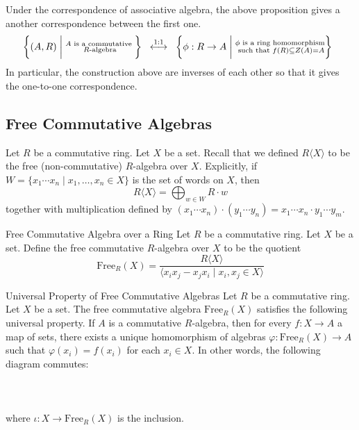 \documentclass[a4paper]{article}
\begin{document}
Under the correspondence of associative algebra, the above proposition gives a another correspondence between the first one. $$\left\{(A,R)\;\bigg{|}\;\substack{A\text{ is a commutative }\\R\text{-algebra}}\right\}\;\;\overset{1:1}{\longleftrightarrow}\;\;\left\{\phi:R\to A\;\bigg{|}\;\substack{\phi\text{ is a ring homomorphism}\\\text{ such that }f(R)\subseteq Z(A)=A}\right\}\;\;$$ In particular, the construction above are inverses of each other so that it gives the one-to-one correspondence. 

\subsection{Free Commutative Algebras}
Let $R$ be a commutative ring. Let $X$ be a set. Recall that we defined $R\langle X\rangle$ to be the free (non-commutative) $R$-algebra over $X$. Explicitly, if $W=\{x_1\cdots x_n\;|\;x_1,\dots,x_n\in X\}$ is the set of words on $X$, then $$R\langle X\rangle=\bigoplus_{w\in W}R\cdot w$$ together with multiplication defined by $(x_1\cdots x_n)\cdot(y_1\cdots y_n)=x_1\cdots x_n\cdot y_1\cdots y_m$. 

\begin{defn}{Free Commutative Algebra over a Ring}{} Let $R$ be a commutative ring. Let $X$ be a set. Define the free commutative $R$-algebra over $X$ to be the quotient $$\text{Free}_R(X)=\frac{R\langle X\rangle}{\langle x_ix_j-x_jx_i\;|\;x_i,x_j\in X\rangle}$$
\end{defn}

\begin{prp}{Universal Property of Free Commutative Algebras}{} Let $R$ be a commutative ring. Let $X$ be a set. The free commutative algebra $\text{Free}_R(X)$ satisfies the following universal property. If $A$ is a commutative $R$-algebra, then for every $f:X\to A$ a map of sets, there exists a unique homomorphism of algebras $\varphi:\text{Free}_R(X)\to A$ such that $\varphi(x_i)=f(x_i)$ for each $x_i\in X$. In other words, the following diagram commutes: \\~\\
\\~\\
where $\iota:X\to\text{Free}_R(X)$ is the inclusion. 
\end{prp}
\end{document}
